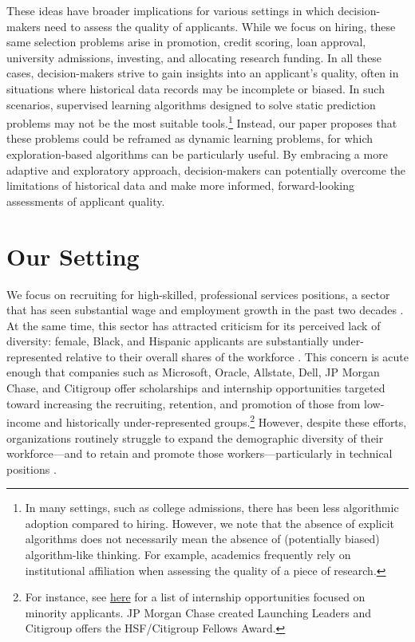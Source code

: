 \documentclass[crop,noquery,editorname,historyrev,nosurname,runningno,sepcount]{RESTUD}
\begin{document}
These ideas have broader implications for various settings in which decision-makers need to assess the quality of applicants. While we focus on hiring, these same selection problems arise in promotion, credit scoring, loan approval, university admissions, investing, and allocating research funding. In all these cases, decision-makers strive to gain insights into an applicant's quality, often in situations where historical data records may be incomplete or biased. 
In such scenarios, supervised learning algorithms designed to solve static prediction problems may not be the most suitable tools.\footnote{In many settings, such as college admissions, there has been less algorithmic adoption compared to hiring.  However, we note that the absence of explicit algorithms does not necessarily mean the absence of (potentially biased) algorithm-like thinking.  For example, academics frequently rely on institutional affiliation when assessing the quality of a piece of research.}  Instead, our paper proposes that these problems could be reframed as dynamic learning problems, for which exploration-based algorithms can be particularly useful. By embracing a more adaptive and exploratory approach, decision-makers can potentially overcome the limitations of historical data and make more informed, forward-looking assessments of applicant quality.



\section{Our Setting} \label{sec:setting}

We focus on recruiting for high-skilled, professional services positions, a sector that has seen substantial wage and employment growth in the past two decades \citep{bls2019}.  At the same time, this sector has attracted criticism for its perceived lack of diversity: female, Black, and Hispanic applicants are substantially under-represented relative to their overall shares of the workforce \citep{pew2018}.  This concern is acute enough that companies such as Microsoft, Oracle, Allstate, Dell, JP Morgan Chase, and Citigroup offer scholarships and internship opportunities targeted toward increasing the recruiting, retention, and promotion of those from low-income and historically under-represented groups.\footnote{For instance, see \href{https://www.Blacknews.com/news/top-internship-programs-for-minority-and-Black-students-for-2018/}{here} for a list of internship opportunities focused on minority applicants. JP Morgan Chase created Launching Leaders and Citigroup offers the HSF/Citigroup Fellows Award.}  However, despite these efforts, organizations routinely struggle to expand the demographic diversity of their workforce---and to retain and promote those workers---particularly in technical positions \citep{jackson2020, castilla2008, atheymentoring}.   
\end{document}
